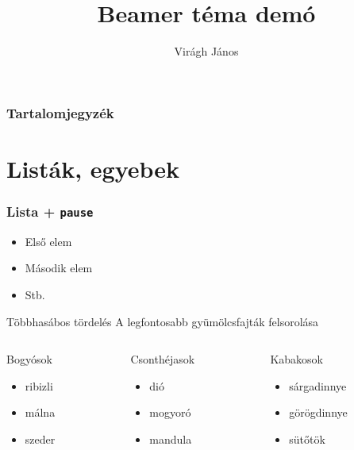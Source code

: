 \documentclass{beamer}
\title{Beamer téma demó}
\author{Virágh János}
\begin{document}
\begin{frame}
\titlepage
\end{frame}
\begin{frame}
\frametitle{Tartalomjegyzék}
\tableofcontents
\end{frame}
\section{Listák, egyebek}
\begin{frame}
\frametitle{Lista + \texttt{pause}}
\begin{itemize}
\item Első elem \pause
\item Második elem \pause
\item Stb.
\end{itemize}
\end{frame}
\begin{frame}[t]{Többhasábos tördelés}
A legfontosabb gyümölcsfajták felsorolása
\vspace*{1em}
\begin{columns} %
\begin{column}{.3\textwidth}
	Bogyósok
	\begin{itemize}
	\item ribizli
	\item málna
	\item szeder
	\end{itemize}
\end{column}
\begin{column}{.3\textwidth}
	Csonthéjasok
	\begin{itemize}
	\item dió
	\item mogyoró
	\item mandula
	\end{itemize}
\end{column}
\begin{column}{.3\textwidth}
	Kabakosok
	\begin{itemize}
	\item sárgadinnye
	\item görögdinnye
	\item sütőtök
	\end{itemize}
\end{column}
\end{columns}
\end{frame}
\end{document}
